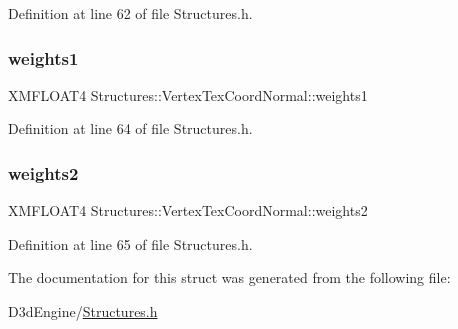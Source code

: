 Definition at line 62 of file Structures.\+h.

\mbox{\label{struct_structures_1_1_vertex_tex_coord_normal_a3ba02c418d9edfebfd52286419e8f3b7}} 
\subsubsection{\texorpdfstring{weights1}{weights1}}
{\footnotesize\ttfamily X\+M\+F\+L\+O\+A\+T4 Structures\+::\+Vertex\+Tex\+Coord\+Normal\+::weights1}



Definition at line 64 of file Structures.\+h.

\mbox{\label{struct_structures_1_1_vertex_tex_coord_normal_a26def3fe41a0899cb7df21c7cdad86ee}} 
\subsubsection{\texorpdfstring{weights2}{weights2}}
{\footnotesize\ttfamily X\+M\+F\+L\+O\+A\+T4 Structures\+::\+Vertex\+Tex\+Coord\+Normal\+::weights2}



Definition at line 65 of file Structures.\+h.



The documentation for this struct was generated from the following file\+:\begin{DoxyCompactItemize}
\item 
D3d\+Engine/\mbox{\hyperlink{_structures_8h}{Structures.\+h}}\end{DoxyCompactItemize}
